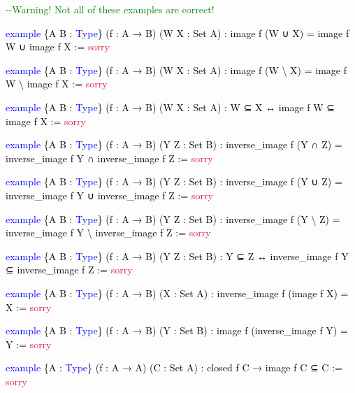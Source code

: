 \documentclass[
  letterpaper,
  DIV=11,
  numbers=noendperiod]{scrreprt}
\newenvironment{Shaded}{\begin{snugshade}}{\end{snugshade}}
\newcommand{\CommentTok}[1]{\textcolor[rgb]{0.37,0.37,0.37}{#1}}
\newcommand{\ConstantTok}[1]{\textcolor[rgb]{0.56,0.35,0.01}{#1}}
\newcommand{\KeywordTok}[1]{\textcolor[rgb]{0.00,0.23,0.31}{#1}}
\newcommand{\NormalTok}[1]{\textcolor[rgb]{0.00,0.23,0.31}{#1}}
\renewcommand{\NormalTok}[1]{\textcolor[HTML]{000000}{#1}}
\renewcommand{\KeywordTok}[1]{\textcolor[HTML]{0000FF}{#1}}
\renewcommand{\CommentTok}[1]{\textcolor[HTML]{008000}{#1}}
\renewcommand{\ConstantTok}[1]{\textcolor[HTML]{DC143C}{#1}}
\theoremstyle{remark}
\begin{document}
\begin{Shaded}
\begin{Highlighting}[]
\CommentTok{{-}{-}Warning!  Not all of these examples are correct!}

\KeywordTok{example}\NormalTok{ \{A B : }\KeywordTok{Type}\NormalTok{\} (f : A → B) (W X : Set A) :}
\NormalTok{    image f (W ∪ X) = image f W ∪ image f X := }\ConstantTok{sorry}

\KeywordTok{example}\NormalTok{ \{A B : }\KeywordTok{Type}\NormalTok{\} (f : A → B) (W X : Set A) :}
\NormalTok{    image f (W \textbackslash{} X) = image f W \textbackslash{} image f X := }\ConstantTok{sorry}

\KeywordTok{example}\NormalTok{ \{A B : }\KeywordTok{Type}\NormalTok{\} (f : A → B) (W X : Set A) :}
\NormalTok{    W ⊆ X ↔ image f W ⊆ image f X := }\ConstantTok{sorry}

\KeywordTok{example}\NormalTok{ \{A B : }\KeywordTok{Type}\NormalTok{\} (f : A → B) (Y Z : Set B) :}
\NormalTok{    inverse\_image f  (Y ∩ Z) =}
\NormalTok{        inverse\_image f Y ∩ inverse\_image f Z := }\ConstantTok{sorry}

\KeywordTok{example}\NormalTok{ \{A B : }\KeywordTok{Type}\NormalTok{\} (f : A → B) (Y Z : Set B) :}
\NormalTok{    inverse\_image f  (Y ∪ Z) =}
\NormalTok{        inverse\_image f Y ∪ inverse\_image f Z := }\ConstantTok{sorry}

\KeywordTok{example}\NormalTok{ \{A B : }\KeywordTok{Type}\NormalTok{\} (f : A → B) (Y Z : Set B) :}
\NormalTok{    inverse\_image f  (Y \textbackslash{} Z) =}
\NormalTok{        inverse\_image f Y \textbackslash{} inverse\_image f Z := }\ConstantTok{sorry}

\KeywordTok{example}\NormalTok{ \{A B : }\KeywordTok{Type}\NormalTok{\} (f : A → B) (Y Z : Set B) :}
\NormalTok{    Y ⊆ Z ↔ inverse\_image f Y ⊆ inverse\_image f Z := }\ConstantTok{sorry}

\KeywordTok{example}\NormalTok{ \{A B : }\KeywordTok{Type}\NormalTok{\} (f : A → B) (X : Set A) :}
\NormalTok{    inverse\_image f (image f X) = X := }\ConstantTok{sorry}

\KeywordTok{example}\NormalTok{ \{A B : }\KeywordTok{Type}\NormalTok{\} (f : A → B) (Y : Set B) :}
\NormalTok{    image f (inverse\_image f Y) = Y := }\ConstantTok{sorry}

\KeywordTok{example}\NormalTok{ \{A : }\KeywordTok{Type}\NormalTok{\} (f : A → A) (C : Set A) :}
\NormalTok{    closed f C → image f C ⊆ C := }\ConstantTok{sorry}


\end{Highlighting}
\end{Shaded}
\end{document}
